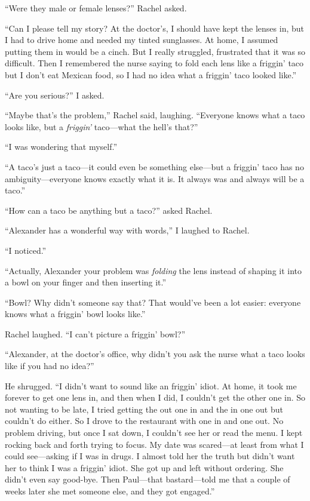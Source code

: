 ``Were they male or female lenses?'' Rachel asked.

``Can I please tell my story? At the doctor's, I should have kept the
lenses in, but I had to drive home and needed my tinted sunglasses. At
home, I assumed putting them in would be a cinch. But I really
struggled, frustrated that it was so difficult. Then I remembered the
nurse saying to fold each lens like a friggin' taco but I don't eat
Mexican food, so I had no idea what a friggin' taco looked like.''

``Are you serious?'' I asked.

``Maybe that's the problem,'' Rachel said, laughing. ``Everyone knows
what a taco looks like, but a \emph{friggin'} taco---what the hell's
that?''

``I was wondering that myself.''

``A taco's just a taco---it could even be something else---but a
friggin' taco has no ambiguity---everyone knows exactly what it is. It
always was and always will be a taco.''

``How can a taco be anything but a taco?'' asked Rachel.

``Alexander has a wonderful way with words,'' I laughed to Rachel.

``I noticed.''

``Actually, Alexander your problem was \emph{folding} the lens instead
of shaping it into a bowl on your finger and then inserting it.''

``Bowl? Why didn't someone say that? That would've been a lot easier:
everyone knows what a friggin' bowl looks like.''

Rachel laughed. ``I can't picture a friggin' bowl?''

``Alexander, at the doctor's office, why didn't you ask the nurse what a
taco looks like if you had no idea?''

He shrugged. ``I didn't want to sound like an friggin' idiot. At home,
it took me forever to get one lens in, and then when I did, I couldn't
get the other one in. So not wanting to be late, I tried getting the out
one in and the in one out but couldn't do either. So I drove to the
restaurant with one in and one out. No problem driving, but once I sat
down, I couldn't see her or read the menu. I kept rocking back and forth
trying to focus. My date was scared---at least from what I could
see---asking if I was in drugs. I almost told her the truth but didn't
want her to think I was a friggin' idiot. She got up and left without
ordering. She didn't even say good-bye. Then Paul---that bastard---told
me that a couple of weeks later she met someone else, and they got
engaged.''

